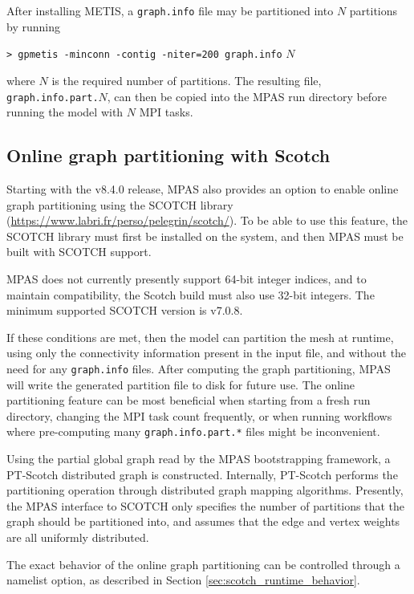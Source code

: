 After installing METIS, a {\tt graph.info} file may be partitioned into $N$
partitions by running

\vspace{12pt}
{\tt > gpmetis -minconn -contig -niter=200 graph.info} $N$
\vspace{12pt}

\noindent where $N$ is the required number of partitions. The resulting file, {\tt graph.info.part.}$N$, 
can then be copied into the MPAS run directory before running the model with $N$ MPI tasks.

\subsection{Online graph partitioning with Scotch}
\label{sec:scotch}
Starting with the v8.4.0 release, MPAS also provides an option to enable online graph partitioning using the SCOTCH library
(\url{https://www.labri.fr/perso/pelegrin/scotch/}). To be able to use this feature, the SCOTCH library
must first be installed on the system, and then MPAS must be built with SCOTCH support. 

MPAS does not currently presently support 64-bit integer indices, and to maintain compatibility, the Scotch build must also use 32-bit integers.
The minimum supported SCOTCH version is v7.0.8.

If these conditions are met, then the model can partition the mesh at runtime, using only the connectivity information
present in the input file, and without the need for any {\tt graph.info} files. After computing the graph partitioning,
MPAS will write the generated partition file to disk for future use. The online partitioning feature can be most beneficial when starting from a fresh run directory, changing the
MPI task count frequently, or when running workflows where pre-computing many {\tt graph.info.part.*} files might be inconvenient.

Using the partial global graph read by the MPAS bootstrapping framework, a PT-Scotch distributed graph is constructed.
Internally, PT-Scotch performs the partitioning operation through distributed graph mapping algorithms. Presently, the
MPAS interface to SCOTCH only specifies the number of partitions that the graph should be partitioned into, and assumes
that the edge and vertex weights are all uniformly distributed. 
 
The exact behavior of the online graph partitioning can be controlled through a namelist option, as described in
 Section \ref{sec:scotch_runtime_behavior}.

